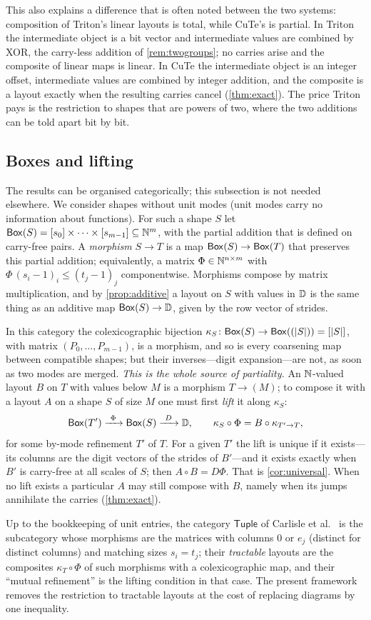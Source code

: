 This also explains a difference that is often noted between the two systems: composition of
Triton's linear layouts is total, while CuTe's is partial. In Triton the intermediate object is a
bit vector and intermediate values are combined by XOR, the carry-less addition of
\cref{rem:twogroups}; no carries arise and the composite of linear maps is linear. In CuTe the
intermediate object is an integer offset, intermediate values are combined by integer addition,
and the composite is a layout exactly when the resulting carries cancel (\cref{thm:exact}). The
price Triton pays is the restriction to shapes that are powers of two, where the two additions
can be told apart bit by bit.

\subsection{Boxes and lifting}\label{sec:box}

The results can be organised categorically; this subsection is not needed elsewhere. We
consider shapes without unit modes (unit modes carry no information about functions). For such a
shape $S$ let $\mathsf{Box}(S)=[s_0]\times\dots\times[s_{m-1}]\subseteq\mathbb{N}^m$, with the partial addition
that is defined on carry-free pairs. A \emph{morphism} $S\to T$ is a map
$\mathsf{Box}(S)\to\mathsf{Box}(T)$ that preserves this partial addition; equivalently, a matrix
$\Phi\in\mathbb{N}^{n\times m}$ with $\Phi\,(s_i-1)_i\le(t_j-1)_j$ componentwise. Morphisms compose by
matrix multiplication, and by \cref{prop:additive} a layout on $S$ with values in $\mathbb{D}$ is the
same thing as an additive map $\mathsf{Box}(S)\to\mathbb{D}$, given by the row vector of strides.

In this category the colexicographic bijection $\kappa_S\colon\mathsf{Box}(S)\to\mathsf{Box}((|S|))=[|S|]$,
with matrix $(P_0,\dots,P_{m-1})$, is a morphism, and so is every coarsening map between
compatible shapes; but their inverses---digit expansion---are not, as soon as two modes are
merged. \emph{This is the whole source of partiality.} An $\mathbb{N}$-valued layout $B$ on $T$ with values below $M$ is a morphism
$T\to(M)$; to compose it with a layout $A$ on a shape $S$ of size $M$ one must first \emph{lift} it
along $\kappa_S$:
\[
 \BoxC(T')\xrightarrow{\ \Phi\ }\BoxC(S)\xrightarrow{\ D\ }\D,
 \qquad \kappa_S\circ\Phi=B\circ\kappa_{T'\to T},
\]
for some by-mode refinement $T'$ of $T$. For a given $T'$ the lift is unique if it exists---its
columns are the digit vectors of the strides of $B'$---and it exists exactly when $B'$ is
carry-free at all scales of $S$; then $A\circ B=D\Phi$. That is \cref{cor:universal}. When no lift exists a particular $A$
may still compose with $B$, namely when its jumps annihilate the carries (\cref{thm:exact}).

Up to the bookkeeping of unit entries, the category $\mathsf{Tuple}$ of Carlisle et
al.~\cite{carlisle2026} is the subcategory whose morphisms are the matrices with columns $0$ or
$e_j$ (distinct for distinct columns) and matching sizes $s_i=t_j$; their \emph{tractable} layouts are the composites $\kappa_T\circ\Phi$ of such
morphisms with a colexicographic map, and their ``mutual refinement'' is the lifting condition in
that case. The present framework removes the restriction to tractable layouts at the cost of
replacing diagrams by one inequality.
